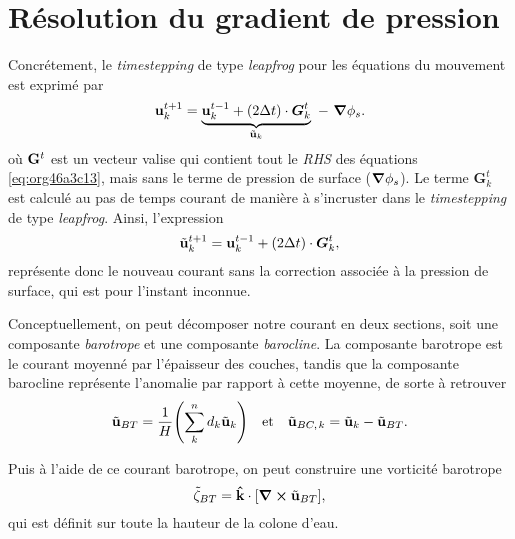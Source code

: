\documentclass[10pt]{report}
\numberwithin{equation}{section}
\newcommand{\kvf}{\vb{\hat{k}}}
\newcommand{\uu}{\vb{u}}
\newcommand{\pt}{\hspace{1pt}} %
\begin{document}
\section{Résolution du gradient de pression}
\label{sec:org12c3065}
\label{org2837550}

Concrétement, le \emph{timestepping} de type \emph{leapfrog} pour les équations du mouvement est exprimé par
\begin{equation}
\label{eq:orgcca339a}
 \uu^{t+1}_k = \underbrace{ \uu^{t-1}_k + (2\Delta t)\cdot \vb*{G}^t_k}_{\tilde{\uu}_k} \ -\ \gradient{\phi_s}.
\end{equation}
où \(\vb{G}^t\) est un vecteur valise qui contient tout le \emph{RHS} des équations \ref{eq:org46a3c13}, mais sans le terme de pression de surface (\(\gradient{\phi_s}\)).
Le terme \(\boldsymbol{G}_k^t\) est calculé au pas de temps courant de manière à s'incruster dans le \emph{timestepping} de type \emph{leapfrog}.
Ainsi, l'expression
\begin{equation}
   \tilde{\uu}^{t+1}_k = \uu^{t-1}_k + (2\Delta t)\cdot \vb*{G}^t_k,
\end{equation}
représente donc le nouveau courant sans la correction associée à la pression de surface, qui est pour l'instant inconnue.\bigskip


Conceptuellement, on peut décomposer notre courant en deux sections, soit une composante \emph{barotrope} et une composante \emph{barocline}.
La composante barotrope est le courant moyenné par l'épaisseur des couches, tandis que la composante barocline représente l'anomalie par rapport à cette moyenne, de sorte à retrouver
\begin{subequations}
\begin{align}
 && \tilde{\uu}_{BT} = \frac{1}{H} \qty(\sum_k^n d_k \tilde{\uu}_k) && \text{et}
 && \tilde{\uu}_{BC,\pt k} = \tilde{\uu}_k - \tilde{\uu}_{BT}. &&
\end{align}
\end{subequations}

Puis à l'aide de ce courant barotrope, on peut construire une vorticité barotrope
\begin{equation}
 \tilde{\zeta}_{BT} = \kvf \cdot \qty[\curl{\tilde{\uu}_{BT}}],
\end{equation}
qui est définit sur toute la hauteur de la colone d'eau.\bigskip
\end{document}
